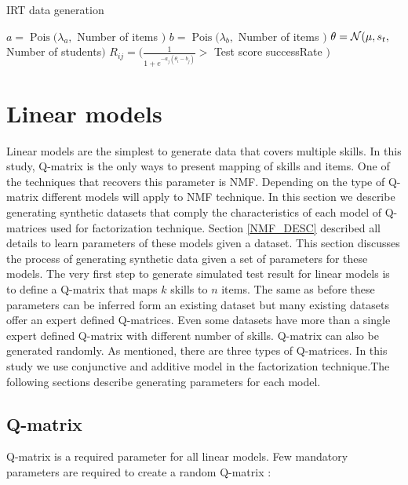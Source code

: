 \begin{algorithm}
\caption{IRT data generation}
\label{CHalgorithm}
\begin{algorithmic}[1]
\State $a = \operatorname{Pois} ({\lambda_a},$ Number of items $)$
\State $b = \operatorname{Pois} ({\lambda_b},$ Number of items $)$
\State $\theta = \mathcal{N}(\mu, s_t ,$ Number of students$)$
\State $R_{ij} = (\frac{1}{1+e^{-a_j(\theta_i-b_j)}} >$ Test score successRate $)$
\EndFor
\EndFor
\end{algorithmic}
\label{Alg:IRTGen}
\end{algorithm}






\section{Linear models}
Linear models are the simplest to generate data that covers multiple skills. In this study, Q-matrix is the only ways to present mapping of skills and items. One of the techniques that recovers this parameter is NMF. Depending on the type of Q-matrix different models will apply to NMF technique. In this section we describe generating synthetic datasets that comply the characteristics of each model of Q-matrices used for factorization technique. Section \ref{NMF_DESC} described all details to learn parameters of these models given a dataset. This section discusses the process of generating synthetic data given a set of parameters for these models.
The very first step to generate simulated test result for linear models is to define a Q-matrix that maps $k$ skills to $n$ items. The same as before these parameters can be inferred form an existing dataset but many existing datasets offer an expert defined Q-matrices. Even some datasets have more than a single expert defined Q-matrix with different number of skills. Q-matrix can also be generated randomly. As mentioned, there are three types of Q-matrices. In this study we use conjunctive and additive model in the factorization technique.The following sections describe generating parameters for each model.

\subsection{Q-matrix}
\label{Q-MatrixObtain}
Q-matrix is a required parameter for all linear models. Few mandatory parameters are required to create a random Q-matrix :

